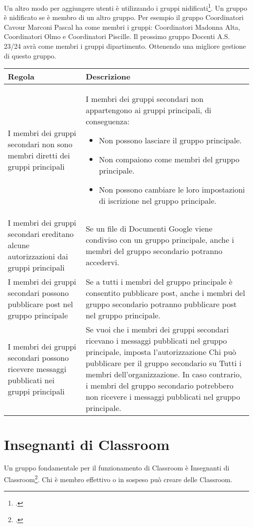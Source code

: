 Un altro modo per aggiungere utenti è utilizzando i gruppi nidificati\footcite{Google2023a}. Un gruppo è nidificato se è membro di un altro gruppo. Per esempio il gruppo Coordinatori Cavour Marconi Pascal ha come membri i gruppi: Coordinatori Madonna Alta, Coordinatori Olmo e Coordinatori Piscille. Il prossimo gruppo Docenti A.S. 23/24 avrà come membri i gruppi dipartimento. Ottenendo una migliore gestione di questo gruppo.

\begin{center}
	\begin{tabularx}{\linewidth}{>{\setlength\hsize{.8\hsize}}X>{\setlength\hsize{\hsize}\setlength\linewidth{\hsize}}X}
\toprule	
Regola&	Descrizione\\
\midrule
I membri dei gruppi secondari non sono membri diretti dei gruppi principali	&
I membri dei gruppi secondari non appartengono ai gruppi principali, di conseguenza:
\begin{itemize}
	\item Non possono lasciare il gruppo principale.
	\item Non compaiono come membri del gruppo principale.
	\item Non possono cambiare le loro impostazioni di iscrizione nel gruppo principale.
\end{itemize}\\
I membri dei gruppi secondari ereditano alcune autorizzazioni dai gruppi principali&
Se un file di Documenti Google viene condiviso con un gruppo principale, anche i membri del gruppo secondario potranno accedervi.\\
I membri dei gruppi secondari possono pubblicare post nel gruppo principale&
Se a tutti i membri del gruppo principale è consentito pubblicare post, anche i membri del gruppo secondario potranno pubblicare post nel gruppo principale.\\
I membri dei gruppi secondari possono ricevere messaggi pubblicati nei gruppi principali&Se vuoi che i membri dei gruppi secondari ricevano i messaggi pubblicati nel gruppo principale, imposta l'autorizzazione Chi può pubblicare per il gruppo secondario su Tutti i membri dell'organizzazione. In caso contrario, i membri del gruppo secondario potrebbero non ricevere i messaggi pubblicati nel gruppo principale.\\
\bottomrule
\end{tabularx}
\end{center}
\section{Insegnanti di Classroom}
Un gruppo fondamentale per il funzionamento di Classroom è Insegnanti di Classroom\footcite{Google2023}. Chi è membro effettivo o in sospeso può creare delle Classroom. 

